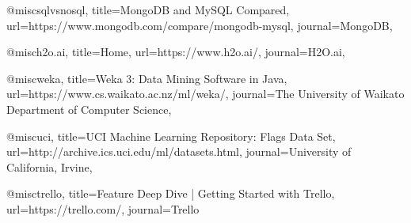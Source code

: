 @misc{sqlvsnosql, title={MongoDB and MySQL Compared}, url={https://www.mongodb.com/compare/mongodb-mysql}, journal={MongoDB}},

@misc{h2o.ai, title={Home}, url={https://www.h2o.ai/}, journal={H2O.ai}},

@misc{weka, title={Weka 3: Data Mining Software in Java}, url={https://www.cs.waikato.ac.nz/ml/weka/}, journal={The University of Waikato Department of Computer Science}},

@misc{uci, title={UCI Machine Learning Repository: Flags Data Set}, url={http://archive.ics.uci.edu/ml/datasets.html}, journal={University of California, Irvine}},

@misc{trello, title={Feature Deep Dive | Getting Started with Trello}, url={https://trello.com/}, journal={Trello}}